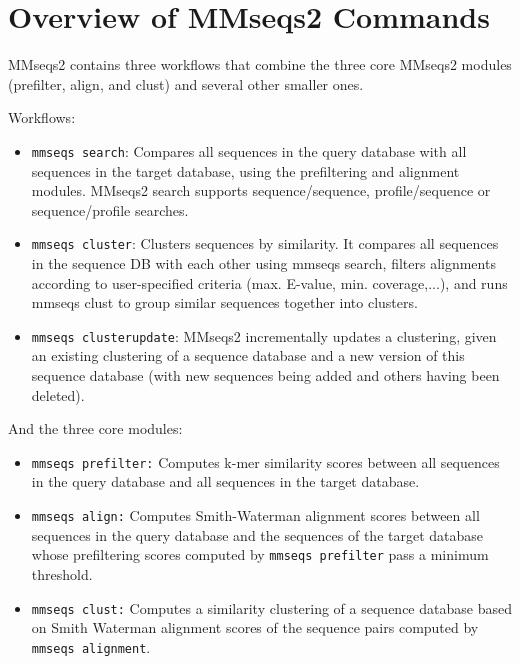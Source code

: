 \documentclass[11pt,a4paper]{scrreprt}
\begin{document}
\section{Overview of MMseqs2 Commands}
MMseqs2 contains three workflows that combine the three core MMseqs2 modules (prefilter, align, and clust) and several other smaller ones. 

Workflows:
\begin{itemize}
\item \texttt{mmseqs search}: Compares all sequences in the query database with all sequences in the target database, using the prefiltering and alignment modules. MMseqs2 search supports sequence/sequence, profile/sequence or sequence/profile searches.
\item \texttt{mmseqs cluster}:  Clusters sequences by similarity. It compares all sequences in the sequence DB with each other using mmseqs search, filters alignments according to user-specified criteria (max. E-value, min. coverage,...),   and runs mmseqs clust to group similar sequences together into clusters.
\item \texttt{mmseqs clusterupdate}: MMseqs2 incrementally updates a clustering, given an existing clustering of a sequence database and a new version of this sequence database (with new sequences being added and others having been deleted).
\end{itemize}

And the three core modules:
\begin{itemize}
\item \texttt{mmseqs prefilter:} Computes k-mer similarity scores between all sequences in the query database and all sequences in the target database.
\item \texttt{mmseqs align:} Computes Smith-Waterman alignment scores between all sequences in the query database and the sequences of the target database whose prefiltering scores computed by \texttt{mmseqs prefilter} pass a minimum threshold.
\item \texttt{mmseqs clust:} Computes a similarity clustering of a sequence database based on Smith Waterman alignment scores of the sequence pairs computed by \texttt{mmseqs alignment}.
\end{itemize}
\end{document}
